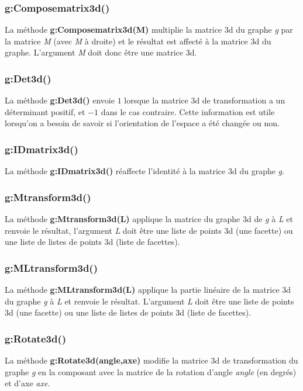 \subsubsection{g:Composematrix3d()}
La méthode \textbf{g:Composematrix3d(M)} multiplie la matrice 3d du graphe \emph g par la matrice \emph{M} (avec \emph{M} à droite) et le résultat est affecté à la matrice 3d du graphe. L'argument \emph{M} doit donc être une matrice 3d.

\subsubsection{g:Det3d()}
La méthode \textbf{g:Det3d()} envoie $1$ lorsque la matrice 3d de transformation a un déterminant positif, et $-1$ dans le cas contraire. Cette information est utile lorsqu'on a besoin de savoir si l'orientation de l'espace a été changée ou non.

\subsubsection{g:IDmatrix3d()}
La méthode \textbf{g:IDmatrix3d()} réaffecte l'identité à la matrice 3d du graphe \emph g.

\subsubsection{g:Mtransform3d()}
La méthode \textbf{g:Mtransform3d(L)} applique la matrice du graphe 3d de \emph g à \emph{L} et renvoie le résultat, l'argument \emph L doit être une liste de points 3d (une facette) ou une liste de listes de points 3d (liste de facettes).

\subsubsection{g:MLtransform3d()}
La méthode \textbf{g:MLtransform3d(L)} applique la partie linéaire de la matrice 3d du graphe \emph g à \emph{L} et renvoie le résultat. L'argument \emph L doit être une liste de points 3d (une facette) ou une liste de listes de points 3d (liste de facettes).

\subsubsection{g:Rotate3d()}
La méthode \textbf{g:Rotate3d(angle,axe)} modifie la matrice 3d de transformation du graphe \emph g en la composant avec la matrice de la rotation d'angle \emph{angle} (en degrés) et d'axe \emph{axe}. 

